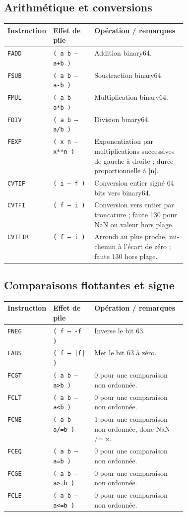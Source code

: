 \documentclass[10pt,a4paper,twoside,openany]{book}
\renewcommand{\arraystretch}{1.12}
\begin{document}
\subsection{Arithmétique et conversions}
\begin{center}
\renewcommand{\arraystretch}{1.16}
\begin{tabularx}{\linewidth}{@{}p{0.19\linewidth} p{0.23\linewidth} X@{}}
\toprule \textbf{Instruction} & \textbf{Effet de pile} & \textbf{Opération / remarques}\\ \midrule
\texttt{FADD} & \texttt{( a b -- a+b )} & Addition binary64.\\
\texttt{FSUB} & \texttt{( a b -- a-b )} & Soustraction binary64.\\
\texttt{FMUL} & \texttt{( a b -- a*b )} & Multiplication binary64.\\
\texttt{FDIV} & \texttt{( a b -- a/b )} & Division binary64.\\
\texttt{FEXP} & \texttt{( x n -- x**n )} & Exponentiation par multiplications successives de gauche à droite ; durée proportionnelle à |n|.\\
\texttt{CVTIF} & \texttt{( i -- f )} & Conversion entier signé 64 bits vers binary64.\\
\texttt{CVTFI} & \texttt{( f -- i )} & Conversion vers entier par troncature ; faute 130 pour NaN ou valeur hors plage.\\
\texttt{CVTFIR} & \texttt{( f -- i )} & Arrondi au plus proche, mi-chemin à l'écart de zéro ; faute 130 hors plage.\\
\bottomrule
\end{tabularx}
\end{center}
\subsection{Comparaisons flottantes et signe}
\begin{center}
\renewcommand{\arraystretch}{1.16}
\begin{tabularx}{\linewidth}{@{}p{0.19\linewidth} p{0.23\linewidth} X@{}}
\toprule \textbf{Instruction} & \textbf{Effet de pile} & \textbf{Opération / remarques}\\ \midrule
\texttt{FNEG} & \texttt{( f -- -f )} & Inverse le bit 63.\\
\texttt{FABS} & \texttt{( f -- |f| )} & Met le bit 63 à zéro.\\
\texttt{FCGT} & \texttt{( a b -- a>b )} & 0 pour une comparaison non ordonnée.\\
\texttt{FCLT} & \texttt{( a b -- a<b )} & 0 pour une comparaison non ordonnée.\\
\texttt{FCNE} & \texttt{( a b -- a/=b )} & 1 pour une comparaison non ordonnée, donc NaN /= x.\\
\texttt{FCEQ} & \texttt{( a b -- a=b )} & 0 pour une comparaison non ordonnée.\\
\texttt{FCGE} & \texttt{( a b -- a>=b )} & 0 pour une comparaison non ordonnée.\\
\texttt{FCLE} & \texttt{( a b -- a<=b )} & 0 pour une comparaison non ordonnée.\\
\bottomrule
\end{tabularx}
\end{center}
\end{document}
